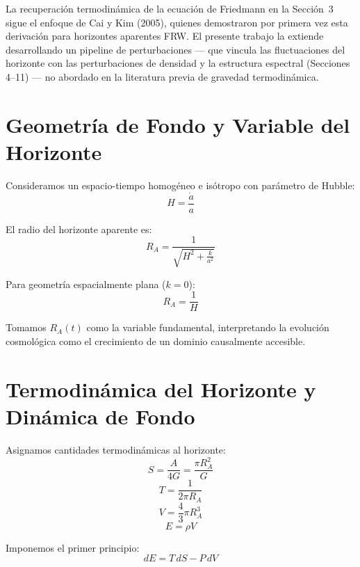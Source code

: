 \documentclass[12pt,a4paper]{article}
\begin{document}
La recuperación termodinámica de la ecuación de Friedmann en la Sección~3 sigue el enfoque de Cai y Kim (2005), quienes demostraron por primera vez esta derivación para horizontes aparentes FRW. El presente trabajo la extiende desarrollando un pipeline de perturbaciones --- que vincula las fluctuaciones del horizonte con las perturbaciones de densidad y la estructura espectral (Secciones 4--11) --- no abordado en la literatura previa de gravedad termodinámica.

\section{Geometría de Fondo y Variable del Horizonte}

Consideramos un espacio-tiempo homogéneo e isótropo con parámetro de Hubble:
\begin{equation}
H = \frac{\dot{a}}{a} \tag{1}
\end{equation}

El radio del horizonte aparente es:
\begin{equation}
R_A = \frac{1}{\sqrt{H^2 + \frac{k}{a^2}}} \tag{2}
\end{equation}

Para geometría espacialmente plana ($k = 0$):
\begin{equation}
R_A = \frac{1}{H} \tag{3}
\end{equation}

Tomamos $R_A(t)$ como la variable fundamental, interpretando la evolución cosmológica como el crecimiento de un dominio causalmente accesible.

\section{Termodinámica del Horizonte y Dinámica de Fondo}

Asignamos cantidades termodinámicas al horizonte:
\begin{equation}
S = \frac{A}{4G} = \frac{\pi R_A^2}{G} \tag{4}
\end{equation}
\begin{equation}
T = \frac{1}{2\pi R_A} \tag{5}
\end{equation}
\begin{equation}
V = \frac{4}{3}\pi R_A^3 \tag{6}
\end{equation}
\begin{equation}
E = \rho V \tag{7}
\end{equation}

Imponemos el primer principio:
\begin{equation}
dE = T\,dS - P\,dV \tag{8}
\end{equation}
\end{document}
